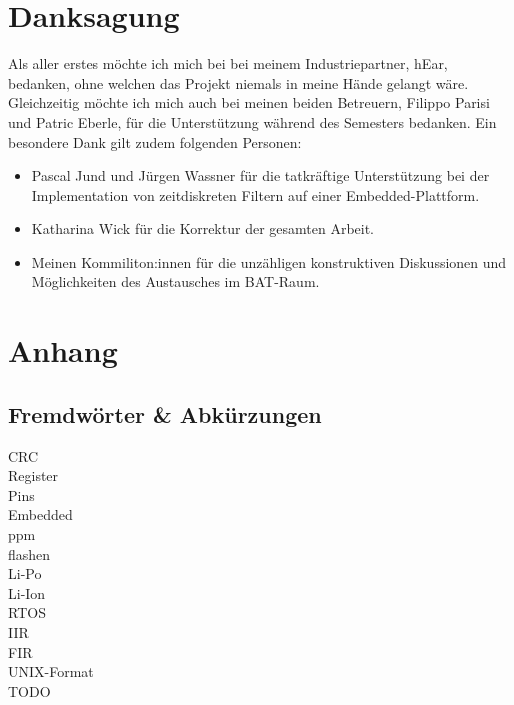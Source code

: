 \documentclass[12pt]{article}
\begin{document}
	\newpage
	\section*{Danksagung}
	Als aller erstes möchte ich mich bei bei meinem Industriepartner, hEar, bedanken, ohne welchen das Projekt niemals in meine Hände gelangt wäre. Gleichzeitig möchte ich mich auch bei meinen beiden Betreuern, Filippo Parisi und Patric Eberle, für die Unterstützung während des Semesters bedanken. Ein besondere Dank gilt zudem folgenden Personen:
	\begin{itemize}
		\item Pascal Jund und Jürgen Wassner für die tatkräftige Unterstützung bei der Implementation von zeitdiskreten Filtern auf einer Embedded-Plattform.
		\item Katharina Wick für die Korrektur der gesamten Arbeit.
		\item Meinen Kommiliton:innen für die unzähligen konstruktiven Diskussionen und Möglichkeiten des Austausches im BAT-Raum. 
	\end{itemize}
	
	\newpage
	\thispagestyle{empty} 
	\section{Anhang}
	
	
	
	\newpage
	\thispagestyle{empty} 
	\listoffigures
	
	\newpage
	\thispagestyle{empty} 
	\subsection{Fremdwörter \& Abkürzungen}
	CRC \\
	Register \\
	Pins \\
	Embedded \\
	ppm \\
	flashen \\
	Li-Po \\
	Li-Ion \\
	RTOS \\
	IIR\\
	FIR\\
	UNIX-Format \\
	\color{red}TODO\color{black}
	
	\newpage
	\thispagestyle{empty} 
\end{document}
